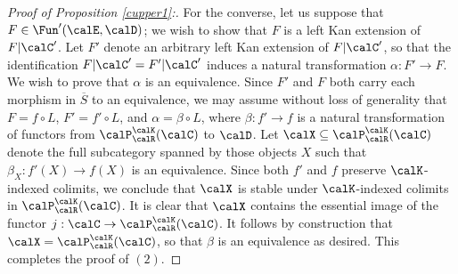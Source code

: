 \begin{proof}[Proof of Proposition \ref{cupper1}:]
For the converse, let us suppose that $F \in \Fun'(\calE, \calD)$; we wish to show that $F$
is a left Kan extension of $F| \calC'$. Let $F'$ denote an arbitrary left Kan extension of
$F | \calC'$, so that the identification $F | \calC' = F' | \calC'$ induces a natural transformation
$\alpha: F' \rightarrow F$. We wish to prove that $\alpha$ is an equivalence. Since $F'$ and
$F$ both carry each morphism in $\overline{S}$ to an equivalence, we may assume without loss of generality that $F = f \circ L$, $F' = f' \circ L$, and $\alpha = \beta \circ L$, where 
$\beta: f' \rightarrow f$ is a natural transformation of functors from $\calP^{\calK}_{\calR}(\calC)$ to
$\calD$. Let $\calX \subseteq \calP^{\calK}_{\calR}(\calC)$ denote the full subcategory spanned by those objects $X$ such that $\beta_{X}: f'(X) \rightarrow f(X)$ is an equivalence. Since both
$f'$ and $f$ preserve $\calK$-indexed colimits, we conclude that $\calX$ is stable under $\calK$-indexed colimits in $\calP^{\calK}_{\calR}(\calC)$. It is clear that $\calX$ contains the essential image
of the functor $j: \calC \rightarrow \calP^{\calK}_{\calR}(\calC)$. It follows by construction that
$\calX = \calP^{\calK}_{\calR}(\calC)$, so that $\beta$ is an equivalence as desired. This completes the proof of $(2)$.


\end{proof}
